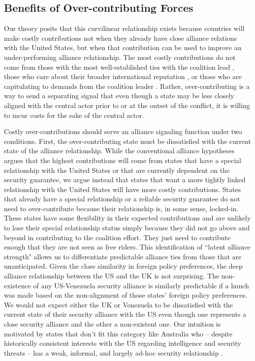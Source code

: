 \documentclass[12pt,letterpaper]{article}
\begin{document}
	\subsection{Benefits of Over-contributing Forces}
		Our theory posits that this curvilinear relationship exists because countries will make costly contributions not when they already have close alliance relations with the United States, but when that contribution can be used to improve an under-performing alliance relationship. The most costly contributions do not come from those with the most well-established ties with the coalition lead \citep{ringsmose_natoburdensharingredux_2010, wolford_showing_2014}, those who care about their broader international reputation \citep{pedersen_bandwagonstatuschanging_2018}, or those who are capitulating to demands from the coalition leader \citep{schweller_newrealistresearch_1997}. Rather, over-contributing is a way to send a separating signal that even though a state may be less closely aligned with the central actor prior to or at the outset of the conflict, it is willing to incur costs for the sake of the central actor.

		Costly over-contributions should serve an alliance signaling function under two conditions. First, the over-contributing state must be dissatisfied with the current state of the alliance relationship. While the conventional alliance hypotheses argues that the highest contributions will come from states that have a special relationship with the United States or that are currently dependent on the security guarantee, we argue instead that states that want a more tightly linked relationship with the United States will have more costly contributions. States that already have a special relationship or a reliable security guarantee do not need to over-contribute because their relationship is, in some sense, locked-in. These states have some flexibility in their expected contributions and are unlikely to lose their special relationship status simply because they did not go above and beyond in contributing to the coalition effort. They just need to contribute enough that they are not seen as free riders. This identification of ``latent alliance strength" allows us to differentiate predictable alliance ties from those that are unanticipated. Given the close similarity in foreign policy preferences, the deep alliance relationship between the US and the UK is not surprising. The non-existence of any US-Venezuela security alliance is similarly predictable if a hunch was made based on the non-alignment of those states' foreign policy preferences. We would not expect either the UK or Venezuela to be dissatisfied with the current state of their security alliance with the US even though one represents a close security alliance and the other a non-existent one. Our intuition is motivated by states that don't fit this category like Australia who -- despite historically consistent interests with the US regarding intelligence and security threats -- has a weak, informal, and largely ad-hoc security relationship \citep{fruhling_anzusreallyalliance_2018}.
		
\end{document}
